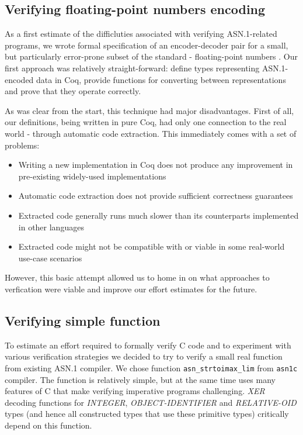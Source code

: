 \documentclass[acmsmall,nonacm]{acmart}
\begin{document}
\subsection{Verifying floating-point numbers encoding}

As a first estimate of the difficluties associated with
verifying ASN.1-related programs, we wrote
formal specification of an encoder-decoder pair for a small, but
particularly error-prone subset of the standard - floating-point numbers \cite{TODO}.
Our first approach was relatively straight-forward: define types
representing ASN.1-encoded data in Coq, provide functions for converting
between representations and prove that they operate correctly.

As was clear from the start, this technique had major disadvantages.
First of all, our definitions, being written in pure Coq, had only one
connection to the real world - through automatic code extraction.
This immediately comes with a set of problems:

\begin{itemize}
\item Writing a new implementation in Coq does not produce any improvement in pre-existing widely-used implementations
\item Automatic code extraction does not provide sufficient correctness guarantees
\item Extracted code generally runs much slower than its counterparts implemented in other languages
\item Extracted code might not be compatible with or viable in some real-world use-case scenarios
\end{itemize}

However, this basic attempt allowed us to home in on what approaches
to verfication were viable and improve our effort estimates for the future. %

\subsection{Verifying simple function}

To estimate an effort required to formally verify C code and to
experiment with various verification strategies we decided to try to
verify a small real function from existing ASN.1 compiler. We chose
function \texttt{asn\_strtoimax\_lim} from \texttt{asn1c} compiler.
The function is relatively simple, but at the same time uses many
features of C that make verifying imperative programs
challenging. \emph{XER} decoding functions for \emph{INTEGER},
\emph{OBJECT-IDENTIFIER} and \emph{RELATIVE-OID} types (and hence all
constructed types that use these primitive types) critically depend on
this function.
\end{document}
